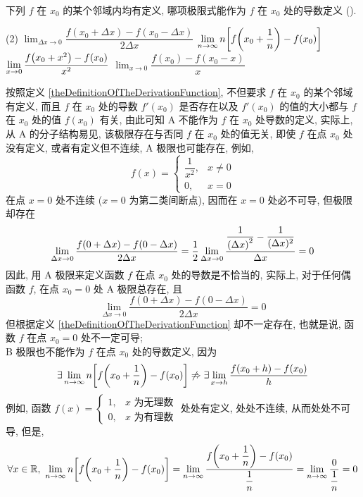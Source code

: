 \begin{example}
    下列 $f$ 在 $x_0$ 的某个邻域内均有定义, 哪项极限式能作为 $f$ 在 $x_0$ 处的导数定义 (\quad).
    \begin{tasks}(2)
        \task $\displaystyle \lim_{\Delta x\to0}\dfrac{f(x_0+\Delta x)-f(x_0-\Delta x)}{2\Delta x}$
        \task $\displaystyle \lim_{n\to\infty}n\qty[f\qty(x_0+\dfrac{1}{n})-f(x_0)]$
        \task $\displaystyle \lim_{x\to0}\dfrac{f\qty(x_0+x^2)-f(x_0)}{x^2}$
        \task $\displaystyle \lim_{x\to0}\dfrac{f(x_0)-f(x_0-x)}{x}$
    \end{tasks}
\end{example}
\begin{solution}
    按照定义 \ref{theDefinitionOfTheDerivationFunction}, 不但要求 $f$ 在 $x_0$ 的某个邻域有定义, 而且 $f$ 在 $x_0$ 处的导数 $f'(x_0)$ 是否存在以及 $f'(x_0)$ 的值的大小都与 $f$ 在 $x_0$ 处的值 $f(x_0)$ 有关, 由此可知 A 不能作为 $f$ 在 $x_0$ 处导数的定义,
    实际上, 从 A 的分子结构易见, 该极限存在与否同 $f$ 在 $x_0$ 处的值无关, 即使 $f$ 在点 $x_0$ 处没有定义, 或者有定义但不连续, A 极限也可能存在, 例如, $$f(x)=\begin{cases}
            \dfrac{1}{x^2}, & x\neq0 \\[6pt]
            0,              & x=0
        \end{cases}$$在点 $x=0$ 处不连续 ($x=0$ 为第二类间断点), 因而在 $x=0$ 处必不可导, 但极限却存在 $$\lim_{\Delta x\to0}\dfrac{f(0+\Delta x)-f(0-\Delta x)}{2\Delta x }=\dfrac{1}{2}\lim_{\Delta x\to0}\dfrac{\dfrac{1}{\qty(\Delta x)^2}-\dfrac{1}{(\Delta x)^2}}{\Delta x}=0$$
    因此, 用 A 极限来定义函数 $f$ 在点 $x_0$ 处的导数是不恰当的, 实际上, 对于任何偶函数 $f$, 在点 $x_0=0$ 处 A 极限总存在, 且 $$\lim_{\Delta x\to0}\dfrac{f(0+\Delta x)-f(0-\Delta x)}{2\Delta x}=0$$
    但根据定义 \ref{theDefinitionOfTheDerivationFunction} 却不一定存在, 也就是说, 函数 $f$ 在点 $x_0=0$ 处不一定可导;\\
    B 极限也不能作为 $f$ 在点 $x_0$ 处的导数定义, 因为
    $$\exists\lim_{n\to\infty}n\qty[f\qty(x_0+\dfrac{1}{n})-f(x_0)]\not\Rightarrow \exists\lim_{x\to h}\dfrac{f(x_0+h)-f(x_0)}{h}$$
    例如, 函数 $f(x)=\begin{cases}
            1, & x\text{ 为无理数} \\
            0, & x\text{ 为有理数}
        \end{cases}$ 处处有定义, 处处不连续, 从而处处不可导, 但是, $$\forall x\in\mathbb{R},~\lim_{n\to\infty}n\qty[f\qty(x_0+\dfrac{1}{n})-f(x_0)]=\lim_{n\to\infty}\dfrac{f\qty(x_0+\dfrac{1}{n})-f(x_0)}{\dfrac{1}{n}}=\lim_{n\to\infty}\dfrac{0}{\dfrac{1}{n}}=0$$

\end{solution}
